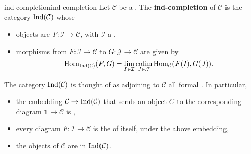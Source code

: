 \begin{topic}{ind-completion}{ind-completion}
    Let $\mathcal{C}$ be a . The \textbf{ind-completion} of $\mathcal{C}$ is the category $\textup{Ind}(\mathcal{C})$ whose
    \begin{itemize}
        \item objects are  $F \colon \mathcal{I} \to \mathcal{C}$, with $\mathcal{I}$ a  ,
        \item morphisms from $F \colon \mathcal{I} \to \mathcal{C}$ to $G \colon \mathcal{J} \to \mathcal{C}$ are given by
        \[ \operatorname{Hom}_{\textup{Ind}(\mathcal{C})}(F, G) = \lim_{I \in \mathcal{I}} \operatorname*{colim}_{J \in \mathcal{J}} \operatorname{Hom}_\mathcal{C}(F(I), G(J)) . \]
    \end{itemize}
    The category $\textup{Ind}(\mathcal{C})$ is thought of as adjoining to $\mathcal{C}$ all formal . In particular,
    \begin{itemize}
        \item the embedding $\mathcal{C} \to \textup{Ind}(\mathcal{C})$ that sends an object $C$ to the corresponding diagram $\textbf{1} \to \mathcal{C}$ is  ,
        \item every diagram $F \colon \mathcal{I} \to \mathcal{C}$ is the  of itself, under the above embedding,
        \item the objects of $\mathcal{C}$ are  in $\textup{Ind}(\mathcal{C})$.
    \end{itemize}
\end{topic}

